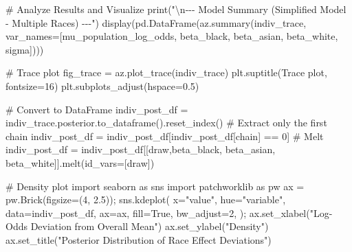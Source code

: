\documentclass[
]{agujournal2019}
\newenvironment{Shaded}{\begin{snugshade}}{\end{snugshade}}
\newcommand{\BuiltInTok}[1]{\textcolor[rgb]{0.00,0.23,0.31}{#1}}
\newcommand{\CharTok}[1]{\textcolor[rgb]{0.13,0.47,0.30}{#1}}
\newcommand{\CommentTok}[1]{\textcolor[rgb]{0.37,0.37,0.37}{#1}}
\newcommand{\DecValTok}[1]{\textcolor[rgb]{0.68,0.00,0.00}{#1}}
\newcommand{\FloatTok}[1]{\textcolor[rgb]{0.68,0.00,0.00}{#1}}
\newcommand{\ImportTok}[1]{\textcolor[rgb]{0.00,0.46,0.62}{#1}}
\newcommand{\NormalTok}[1]{\textcolor[rgb]{0.00,0.23,0.31}{#1}}
\newcommand{\OperatorTok}[1]{\textcolor[rgb]{0.37,0.37,0.37}{#1}}
\newcommand{\StringTok}[1]{\textcolor[rgb]{0.13,0.47,0.30}{#1}}
\newcommand{\VariableTok}[1]{\textcolor[rgb]{0.07,0.07,0.07}{#1}}
\begin{document}
\begin{Shaded}
\begin{Highlighting}[]
\CommentTok{\# Analyze Results and Visualize}
\BuiltInTok{print}\NormalTok{(}\StringTok{"}\CharTok{\textbackslash{}n}\StringTok{{-}{-}{-} Model Summary (Simplified Model {-} Multiple Races) {-}{-}{-}"}\NormalTok{)}
\NormalTok{display(pd.DataFrame(az.summary(indiv\_trace, var\_names}\OperatorTok{=}\NormalTok{[}\StringTok{\textquotesingle{}mu\_population\_log\_odds\textquotesingle{}}\NormalTok{, }\StringTok{\textquotesingle{}beta\_black\textquotesingle{}}\NormalTok{, }\StringTok{\textquotesingle{}beta\_asian\textquotesingle{}}\NormalTok{, }\StringTok{\textquotesingle{}beta\_white\textquotesingle{}}\NormalTok{, }\StringTok{\textquotesingle{}sigma\textquotesingle{}}\NormalTok{])))}

\CommentTok{\# Trace plot}
\NormalTok{fig\_trace }\OperatorTok{=}\NormalTok{ az.plot\_trace(indiv\_trace)}
\NormalTok{plt.suptitle(}\StringTok{\textquotesingle{}Trace plot\textquotesingle{}}\NormalTok{, fontsize}\OperatorTok{=}\DecValTok{16}\NormalTok{)}
\NormalTok{plt.subplots\_adjust(hspace}\OperatorTok{=}\FloatTok{0.5}\NormalTok{) }

\CommentTok{\# Convert to DataFrame}
\NormalTok{indiv\_post\_df }\OperatorTok{=}\NormalTok{ indiv\_trace.posterior.to\_dataframe().reset\_index()}
\CommentTok{\# Extract only the first chain}
\NormalTok{indiv\_post\_df }\OperatorTok{=}\NormalTok{ indiv\_post\_df[indiv\_post\_df[}\StringTok{\textquotesingle{}chain\textquotesingle{}}\NormalTok{] }\OperatorTok{==} \DecValTok{0}\NormalTok{]}
\CommentTok{\# Melt}
\NormalTok{indiv\_post\_df }\OperatorTok{=}\NormalTok{ indiv\_post\_df[[}\StringTok{\textquotesingle{}draw\textquotesingle{}}\NormalTok{,}\StringTok{\textquotesingle{}beta\_black\textquotesingle{}}\NormalTok{, }\StringTok{\textquotesingle{}beta\_asian\textquotesingle{}}\NormalTok{, }\StringTok{\textquotesingle{}beta\_white\textquotesingle{}}\NormalTok{]].melt(id\_vars}\OperatorTok{=}\NormalTok{[}\StringTok{\textquotesingle{}draw\textquotesingle{}}\NormalTok{])}

\CommentTok{\# Density plot}
\ImportTok{import}\NormalTok{ seaborn }\ImportTok{as}\NormalTok{ sns}
\ImportTok{import}\NormalTok{ patchworklib }\ImportTok{as}\NormalTok{ pw}
\NormalTok{ax }\OperatorTok{=}\NormalTok{ pw.Brick(figsize}\OperatorTok{=}\NormalTok{(}\DecValTok{4}\NormalTok{, }\FloatTok{2.5}\NormalTok{))}\OperatorTok{;}
\NormalTok{sns.kdeplot(}
\NormalTok{    x}\OperatorTok{=}\StringTok{"value"}\NormalTok{, hue}\OperatorTok{=}\StringTok{"variable"}\NormalTok{, data}\OperatorTok{=}\NormalTok{indiv\_post\_df, ax}\OperatorTok{=}\NormalTok{ax,}
\NormalTok{    fill}\OperatorTok{=}\VariableTok{True}\NormalTok{, bw\_adjust}\OperatorTok{=}\DecValTok{2}\NormalTok{,}
\NormalTok{)}\OperatorTok{;}
\NormalTok{ax.set\_xlabel(}\StringTok{"Log{-}Odds Deviation from Overall Mean"}\NormalTok{)}
\NormalTok{ax.set\_ylabel(}\StringTok{"Density"}\NormalTok{)}
\NormalTok{ax.set\_title(}\StringTok{"Posterior Distribution of Race Effect Deviations"}\NormalTok{)}
\end{Highlighting}
\end{Shaded}
\end{document}
